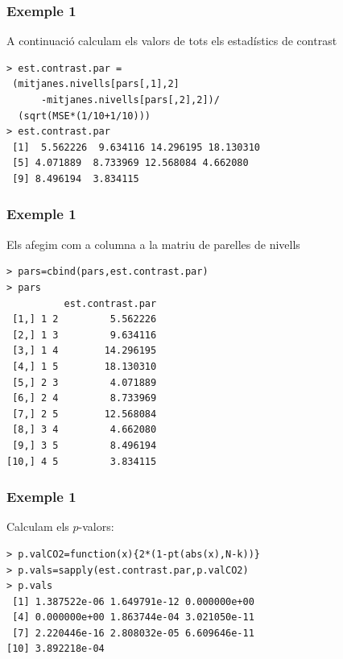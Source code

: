 \documentclass[12pt,t]{beamer}
\theoremstyle{plain}
\theoremstyle{definition}
\begin{document}
\begin{frame}[fragile]
\frametitle{Exemple 1}

A continuació calculam els valors  de tots els estadístics de contrast
\begin{verbatim}
> est.contrast.par =
 (mitjanes.nivells[pars[,1],2]
      -mitjanes.nivells[pars[,2],2])/
  (sqrt(MSE*(1/10+1/10)))
> est.contrast.par
 [1]  5.562226  9.634116 14.296195 18.130310  
 [5] 4.071889  8.733969 12.568084 4.662080  
 [9] 8.496194  3.834115
\end{verbatim}

\end{frame}

\begin{frame}[fragile]
\frametitle{Exemple 1}
\vspace*{-2ex}

Els afegim com a columna a la matriu de parelles de nivells
\begin{verbatim}
> pars=cbind(pars,est.contrast.par)
> pars
          est.contrast.par
 [1,] 1 2         5.562226
 [2,] 1 3         9.634116
 [3,] 1 4        14.296195
 [4,] 1 5        18.130310
 [5,] 2 3         4.071889
 [6,] 2 4         8.733969
 [7,] 2 5        12.568084
 [8,] 3 4         4.662080
 [9,] 3 5         8.496194
[10,] 4 5         3.834115
\end{verbatim}

\end{frame}

\begin{frame}[fragile]
\frametitle{Exemple 1}
\vspace*{-2ex}

Calculam els $p$-valors:

\begin{verbatim}
> p.valCO2=function(x){2*(1-pt(abs(x),N-k))}
> p.vals=sapply(est.contrast.par,p.valCO2)
> p.vals
 [1] 1.387522e-06 1.649791e-12 0.000000e+00
 [4] 0.000000e+00 1.863744e-04 3.021050e-11
 [7] 2.220446e-16 2.808032e-05 6.609646e-11
[10] 3.892218e-04
\end{verbatim}

\end{frame}
\end{document}
